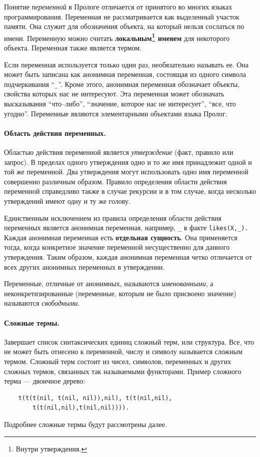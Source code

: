 \documentclass[12pt, openany, twoside]{book} %
\begin{document}
Понятие \emph{переменной} в Прологе отличается от принятого во многих  языках программирования. Переменная не рассматривается как выделенный участок памяти. Она служит для обозначения объекта, на который нельзя сослаться по имени. Переменную можно считать {\bf локальным\footnote{Внутри утверждения.} именем} для некоторого объекта. Переменная также является термом.

Если переменная используется только один раз, необязательно называть ее. Она может быть записана как анонимная переменная, состоящая из одного символа подчеркивания ``{\tt \_}''. Кроме этого, анонимная переменная обозначает объекты, свойства которых нас не интересуют. Эта переменная может обозначать высказывания ``что--либо'', ``значение, которое нас не интересует'', ``все, что угодно''. Переменные являются элементарными объектами языка Пролог.

\paragraph{Область действия переменных.} Областью\linebreak{} действия переменной является \emph{утверждение} (факт, правило или запрос). В пределах одного утверждения одно и то же имя принадлежит одной и той же переменной. Два утверждения могут использовать одно имя переменной совершенно различным образом. Правило определения области действия переменной справедливо также в случае рекурсии и в том случае, когда несколько утверждений имеют одну и ту же голову.

Единственным исключением из правила определения области действия переменных является анонимная переменная, например, {\tt \_} в факте {\tt likes(Х,\_).} Каждая анонимная переменная есть {\bf отдельная сущность}. Она применяется тогда, когда конкретное значение переменной несущественно для данного утверждения. Таким образом, каждая анонимная переменная четко отличается от всех других анонимных переменных в утверждении.

Переменные, отличные от анонимных, называются {\em именованными}, а неконкретизированные (переменные, которым не было присвоено значение) называются {\em свободными}.

\paragraph{Сложные термы.} Завершает список синтаксических единиц сложный терм, или структура. Все, что не может быть отнесено к переменной, числу и символу называется сложным термом. Сложный терм состоит из чисел, символов, переменных и других сложных термов, связанных так называемыми функторами. Пример сложного терма --- двоичное дерево:
{\tt\begin{verbatim}
    t(t(t(nil, t(nil, nil)),nil), t(t(nil,nil),
        t(t(nil,nil),t(nil,nil)))).
\end{verbatim}}
\noindent Подробнее сложные термы будут рассмотрены далее.
\end{document}
